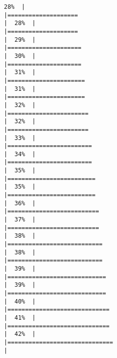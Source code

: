 \documentclass[
]{book}
\begin{document}
\begin{verbatim}
28%  |                                                                              |====================                                                  |  28%  |                                                                              |====================                                                  |  29%  |                                                                              |=====================                                                 |  30%  |                                                                              |=====================                                                 |  31%  |                                                                              |======================                                                |  31%  |                                                                              |======================                                                |  32%  |                                                                              |=======================                                               |  32%  |                                                                              |=======================                                               |  33%  |                                                                              |========================                                              |  34%  |                                                                              |========================                                              |  35%  |                                                                              |=========================                                             |  35%  |                                                                              |=========================                                             |  36%  |                                                                              |==========================                                            |  37%  |                                                                              |==========================                                            |  38%  |                                                                              |===========================                                           |  38%  |                                                                              |===========================                                           |  39%  |                                                                              |============================                                          |  39%  |                                                                              |============================                                          |  40%  |                                                                              |=============================                                         |  41%  |                                                                              |=============================                                         |  42%  |                                                                              |==============================                                        |  
\end{verbatim}
\end{document}

